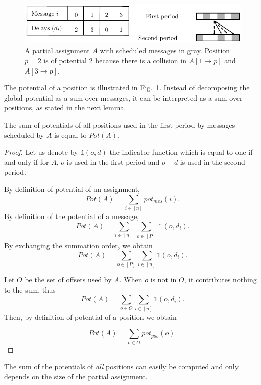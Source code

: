\documentclass[a4paper,UKenglish,cleveref, autoref, thm-restate]{lipics-v2019}
\begin{document}
\begin{figure}
\begin{center}
\includegraphics[scale=1]{positionspotential}
\end{center}
\caption{A partial assignment $A$ with scheduled messages in gray. Position $p=2$ is of potential $2$ because there is a collision in $A[1 \rightarrow p]$ and  $A[3 \rightarrow p]$.}
\label{fig:positionpotential}
\end{figure}

The potential of a position is illustrated in Fig.~\ref{fig:positionpotential}. Instead of decomposing the global potential as a sum over messages, it can be interpreted as a sum over positions, as stated in the next lemma.

\begin{lemma}\label{lemma:pot_pos}
The sum of potentials of all positions used in the first period by messages scheduled by $A$ is equal to $Pot(A)$.  
\end{lemma}
\begin{proof}
 Let us denote by $\mathbb{1}(o,d)$ the indicator function which is equal to one if and only if for $A$, $o$ is used in the first period and $o+d$ is used in the second period.

By definition of potential of an assignment, 
$$Pot(A) = \sum_{i \in [n]} pot_{mes}(i).$$
By definition of the potential of a message, 
$$\displaystyle{Pot(A) = \sum_{i \in [n]} \sum_{\substack{o \in [P]}} \mathbb{1}(o,d_i) }.$$
By exchanging the summation order, we obtain
$$\displaystyle{Pot(A) = \sum_{o \in [P] }\sum_{i \in [n]} \mathbb{1}(o,d_i) }.$$

Let $O$ be the set of offsets used by $A$.
When $o$ is not in $O$, it contributes nothing to the sum, thus
$$\displaystyle{Pot(A) = \sum_{o \in O} \sum_{i \in [n]} \mathbb{1}(o,d_i) }.$$
Then, by definition of potential of a position we obtain

$$\displaystyle{Pot(A) = \sum_{o \in O} pot_{pos}(o)}.$$
\end{proof}

The sum of the potentials of \emph{all} positions can easily be computed and only depends on the size of the partial assignment.
\end{document}
